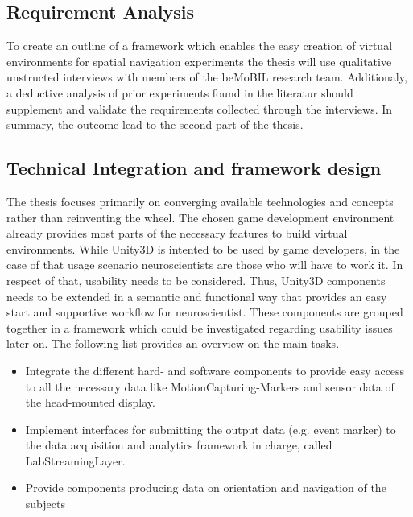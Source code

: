 \documentclass[bibtex,apacite]{apa6}
\newcommand{\cItemSpacing}{0.05em}
\begin{document}
\subsection*{Requirement Analysis}
To create an outline of a framework which enables the easy creation of virtual environments for spatial navigation experiments the thesis will use qualitative unstructed interviews with members of the beMoBIL research team. Additionaly, a deductive analysis of prior experiments found in the literatur should supplement and validate the requirements collected through the interviews. In summary, the outcome lead to the second part of the thesis.

\subsection*{Technical Integration and framework design} 
The thesis focuses primarily on converging available technologies and concepts rather than reinventing the wheel. The chosen game development environment already provides most parts of the necessary features to build virtual environments. While Unity3D is intented to be used by game developers, in the case of that usage scenario neuroscientists are those who will have to work it. In respect of that, usability needs to be considered. 
Thus, Unity3D components needs to be extended in a semantic and functional way that provides an easy start and supportive workflow for neuroscientist. These components are grouped together in a framework which could be investigated regarding usability issues later on. The following list provides an overview on the main tasks.

\begin{itemize}
\setlength\itemsep{\cItemSpacing}
\item Integrate the different hard- and software components to provide easy access to all the necessary data like MotionCapturing-Markers and sensor data of the head-mounted display.
\item Implement interfaces for submitting the output data (e.g. event marker) to the data acquisition and analytics framework in charge, called LabStreamingLayer.
\item Provide components producing data on orientation and navigation of the subjects
\end{itemize}
\end{document}
